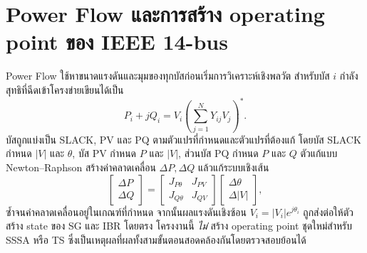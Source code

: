 \documentclass[12pt,a4paper]{article}
\begin{document}
\section{Power Flow และการสร้าง operating point ของ IEEE 14-bus}
Power Flow ใช้หาขนาดแรงดันและมุมของทุกบัสก่อนเริ่มการวิเคราะห์เชิงพลวัต สำหรับบัส $i$ กำลังสุทธิที่ฉีดเข้าโครงข่ายเขียนได้เป็น
\begin{equation}
P_i+jQ_i=V_i\left(\sum_{j=1}^{N}Y_{ij}V_j\right)^{*}.
\label{eq:pfpower}
\end{equation}
บัสถูกแบ่งเป็น SLACK, PV และ PQ ตามตัวแปรที่กำหนดและตัวแปรที่ต้องแก้ โดยบัส SLACK กำหนด $|V|$ และ $\theta$, บัส PV กำหนด $P$ และ $|V|$, ส่วนบัส PQ กำหนด $P$ และ $Q$ ตัวแก้แบบ Newton--Raphson สร้างค่าคลาดเคลื่อน $\Delta P,\Delta Q$ แล้วแก้ระบบเชิงเส้น
\begin{equation}
\begin{bmatrix}\Delta P\\ \Delta Q\end{bmatrix}=
\begin{bmatrix}J_{P\theta}&J_{PV}\\J_{Q\theta}&J_{QV}\end{bmatrix}
\begin{bmatrix}\Delta\theta\\\Delta |V|\end{bmatrix},
\label{eq:pfnewton}
\end{equation}
ซ้ำจนค่าคลาดเคลื่อนอยู่ในเกณฑ์ที่กำหนด จากนั้นผลแรงดันเชิงซ้อน $V_i=|V_i|e^{j\theta_i}$ ถูกส่งต่อให้ตัวสร้าง state ของ SG และ IBR โดยตรง โครงงานนี้ \emph{ไม่} สร้าง operating point ชุดใหม่สำหรับ SSSA หรือ TS ซึ่งเป็นเหตุผลที่ผลทั้งสามขั้นตอนสอดคล้องกันโดยตรวจสอบย้อนได้
\end{document}
